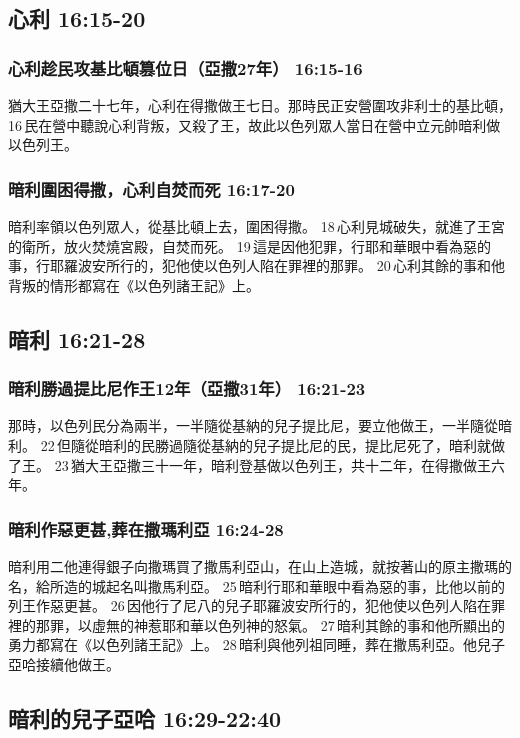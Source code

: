 \subsection{心利 16:15-20 }
\subsubsection{心利趁民攻基比頓篡位日（亞撒27年） 16:15-16 } 
猶大王亞撒二十七年，心利在得撒做王七日。那時民正安營圍攻非利士的基比頓， 16 民在營中聽說心利背叛，又殺了王，故此以色列眾人當日在營中立元帥暗利做以色列王。
 
\subsubsection{暗利圍困得撒，心利自焚而死 16:17-20 } 
暗利率領以色列眾人，從基比頓上去，圍困得撒。 18 心利見城破失，就進了王宮的衛所，放火焚燒宮殿，自焚而死。 19 這是因他犯罪，行耶和華眼中看為惡的事，行耶羅波安所行的，犯他使以色列人陷在罪裡的那罪。 20 心利其餘的事和他背叛的情形都寫在《以色列諸王記》上。

\subsection{暗利 16:21-28}
\subsubsection{暗利勝過提比尼作王12年（亞撒31年） 16:21-23}
那時，以色列民分為兩半，一半隨從基納的兒子提比尼，要立他做王，一半隨從暗利。 22 但隨從暗利的民勝過隨從基納的兒子提比尼的民，提比尼死了，暗利就做了王。 23 猶大王亞撒三十一年，暗利登基做以色列王，共十二年，在得撒做王六年。
 

\subsubsection{暗利作惡更甚,葬在撒瑪利亞 16:24-28}
暗利用二他連得銀子向撒瑪買了撒馬利亞山，在山上造城，就按著山的原主撒瑪的名，給所造的城起名叫撒馬利亞。 25 暗利行耶和華眼中看為惡的事，比他以前的列王作惡更甚。 26 因他行了尼八的兒子耶羅波安所行的，犯他使以色列人陷在罪裡的那罪，以虛無的神惹耶和華以色列神的怒氣。 27 暗利其餘的事和他所顯出的勇力都寫在《以色列諸王記》上。 28 暗利與他列祖同睡，葬在撒馬利亞。他兒子亞哈接續他做王。

\subsection{暗利的兒子亞哈 16:29-22:40 }
